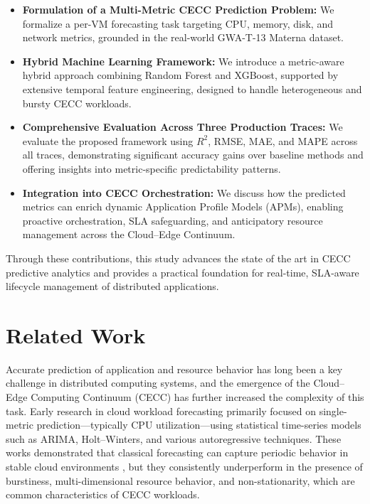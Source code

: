\documentclass[a4paper,fleqn]{cas-dc}
\begin{document}
\begin{itemize}
\item \textbf{Formulation of a Multi-Metric CECC Prediction Problem:} We formalize a per-VM forecasting task targeting CPU, memory, disk, and network metrics, grounded in the real-world GWA-T-13 Materna dataset.
\item \textbf{Hybrid Machine Learning Framework:} We introduce a metric-aware hybrid approach combining Random Forest and XGBoost, supported by extensive temporal feature engineering, designed to handle heterogeneous and bursty CECC workloads.
\item \textbf{Comprehensive Evaluation Across Three Production Traces:} We evaluate the proposed framework using $R^2$, RMSE, MAE, and MAPE across all traces, demonstrating significant accuracy gains over baseline methods and offering insights into metric-specific predictability patterns.
\item \textbf{Integration into CECC Orchestration:} We discuss how the predicted metrics can enrich dynamic Application Profile Models (APMs), enabling proactive orchestration, SLA safeguarding, and anticipatory resource management across the Cloud--Edge Continuum.
\end{itemize}

Through these contributions, this study advances the state of the art in CECC predictive analytics and provides a practical foundation for real-time, SLA-aware lifecycle management of distributed applications.

\section{Related Work}
\label{sec:related}

Accurate prediction of application and resource behavior has long been a key challenge in distributed computing systems, and the emergence of the Cloud--Edge Computing Continuum (CECC) has further increased the complexity of this task. Early research in cloud workload forecasting primarily focused on single-metric prediction---typically CPU utilization---using statistical time-series models such as ARIMA, Holt--Winters, and various autoregressive techniques. These works demonstrated that classical forecasting can capture periodic behavior in stable cloud environments \cite{b3,b4}, but they consistently underperform in the presence of burstiness, multi-dimensional resource behavior, and non-stationarity, which are common characteristics of CECC workloads.
\end{document}
